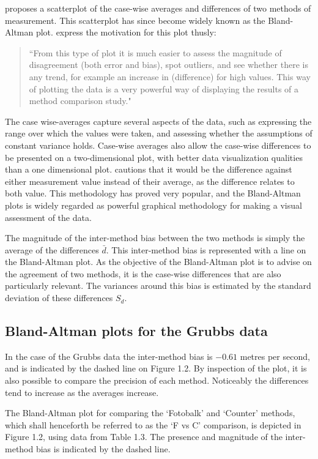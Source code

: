 \documentclass[12pt, a4paper]{report}
\theoremstyle{plain}
\theoremstyle{definition}
\theoremstyle{remark}
\begin{document}
\citet{BA83} proposes a scatterplot of the case-wise averages and differences of two methods of measurement. This scatterplot has since become widely known as the Bland-Altman plot. \citet*{BA83} express the
motivation for this plot thusly:
\begin{quote}
``From this type of plot it is much easier to assess the magnitude
of disagreement (both error and bias), spot outliers, and see
whether there is any trend, for example an increase in (difference) for high values. This way of plotting the data is a very powerful way of displaying the results of a method comparison study."
\end{quote}

The case wise-averages capture several aspects of the data, such as expressing the range over which the values were taken, and assessing whether the assumptions of constant variance holds.
Case-wise averages also allow the case-wise differences to be presented on a two-dimensional plot, with better data visualization qualities than a one dimensional plot. \citet{BA86}
cautions that it would be the difference against either measurement value instead of their average, as the difference relates to both value. This methodology has proved very popular, and the Bland-Altman plots is widely regarded as powerful graphical methodology for making a visual assessment of the data.

The magnitude of the inter-method bias between the two methods is simply the average of the differences $\bar{d}$. This inter-method bias is represented with a line on the Bland-Altman plot. As the objective of the Bland-Altman plot is to advise on the agreement of two methods, it is the case-wise differences that are also particularly relevant. The variances around this bias is estimated by the standard deviation of these differences $S_{d}$.

\subsection{Bland-Altman plots for the Grubbs data}

In the case of the Grubbs data the inter-method bias is $-0.61$ metres per second, and is indicated by the dashed line on Figure 1.2. By inspection of the plot, it is also possible to compare the precision of each method. Noticeably the differences tend to increase as the averages increase.


The Bland-Altman plot for comparing the `Fotobalk' and `Counter'
methods, which shall henceforth be referred to as the `F vs C'
comparison,  is depicted in Figure 1.2, using data from Table 1.3.
The presence and magnitude of the inter-method bias is indicated
by the dashed line.
\newpage
\end{document}
